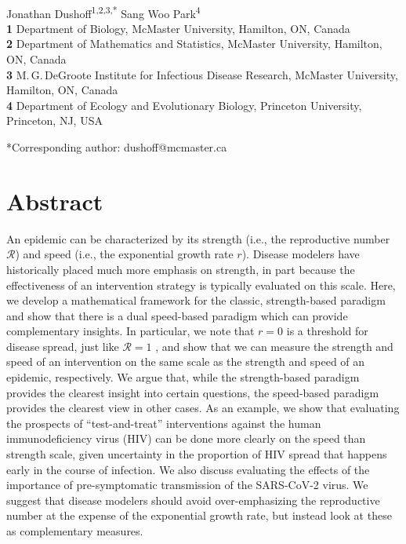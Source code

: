 \documentclass[12pt]{article}
\date{\today}
\newcommand{\RR}{\ensuremath{{\mathcal R}}}
\begin{document}
\begin{flushleft}{
	{\huge \textbf{}}
	\textbf{}
}
\newline
\\
Jonathan Dushoff\textsuperscript{1,2,3,*}
Sang Woo Park\textsuperscript{4}
\\
\bigskip
\textbf{1} Department of Biology, McMaster University, Hamilton, ON, Canada
\\
\textbf{2} Department of Mathematics and Statistics, McMaster University, Hamilton, ON, Canada
\\
\textbf{3} M.\,G.\,DeGroote Institute for Infectious Disease Research, McMaster University, Hamilton, ON, Canada
\\
\textbf{4} Department of Ecology and Evolutionary Biology, Princeton University, Princeton, NJ, USA
\\
\bigskip

*Corresponding author: dushoff@mcmaster.ca
\end{flushleft}

\section*{Abstract}

An epidemic can be characterized by its strength (i.e., the reproductive number \RR) and speed (i.e., the exponential growth rate $r$).
Disease modelers have historically placed much more emphasis on strength, in part because the effectiveness of an intervention strategy is typically evaluated on this scale.  
Here, we develop a mathematical framework for the classic, strength-based paradigm and show that there is a dual speed-based paradigm which can provide complementary insights.
In particular, we note that $r=0$ is a threshold for disease spread, just like $\RR=1$ \cite{dhmKermack}, and show that we can measure the strength and speed of an intervention on the same scale as the strength and speed of an epidemic, respectively.
We argue that, while the strength-based paradigm provides the clearest insight into certain questions, the speed-based paradigm provides the clearest view in other cases.
As an example, we show that evaluating the prospects of ``test-and-treat'' interventions against the human immunodeficiency virus (HIV) can be done more clearly on the speed than strength scale, given uncertainty in the proportion of HIV spread that happens early in the course of infection. 
We also discuss evaluating the effects of the importance of pre-symptomatic transmission of the SARS-CoV-2 virus.
We suggest that disease modelers should avoid over-emphasizing the reproductive number at the expense of the exponential growth rate, but instead look at these as complementary measures.
\end{document}
